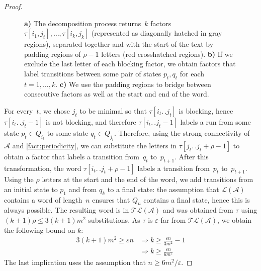 \documentclass[letterpaper, USenglish, cleveref, autoref, thm-restate, numberwithinsect]{lipics-v2021}
\theoremstyle{theorem}
\theoremstyle{definition}
\newcommand{\Aa}{\mathcal{A}}
\newcommand{\dd}{.\,.}
\newcommand{\eps}{\varepsilon}
\newcommand{\lang}[1]{\mathcal{L}(#1)}
\newcommand{\timedlang}[1]{\mathcal{TL}( #1 )}
\begin{document}
\begin{proof}
\begin{figure}[htbp]
\begin{center}

        \caption[Decomposition process for finding many blocking factors in $\eps$-far words]{\textbf{a)} The decomposition process returns~$k$ factors $\tau[i_1, j_t], \ldots, \tau[i_k,j_k]$ (represented as diagonally hatched in gray regions), separated together and with the start of the text by padding regions of $\rho-1$ letters (red crosshatched regions).
        \textbf{b)} If we exclude the last letter of each blocking factor, we obtain factors that label transitions between some pair of states $p_t, q_t$ for each $t = 1,\ldots, k$.
        \textbf{c)} We use the padding regions to bridge between consecutive factors as well as the start and end of the word.}
        \label{fig:many-blocking}
    \end{center}
    \end{figure}

    For every~$t$, we chose $j_t$ to be minimal so that $\tau[i_t\dd j_t]$ is blocking, hence $\tau[i_t\dd j_t-1]$ is not blocking, and therefore $\tau[i_t\dd j_t-1]$ labels a run from some state $p_t \in Q_{i_t}$ to some state $q_t \in Q_{j_t}$.
    Therefore, using the strong connectivity of~$\Aa$ and \cref{fact:periodicity}, we can substitute  the letters in $\tau[j_t\dd  j_t+\rho-1]$ to obtain a factor that labels a transition from~$q_t$ to~$p_{t+1}$. After this transformation, the word $\tau[i_t\dd  j_t+\rho-1]$ labels a transition from~$p_t$ to~$p_{t+1}$.
    Using the $\rho$ letters at the start and the end of the word, we add transitions from an initial state to $p_1$ and from $q_k$ to a final state: the assumption that $\lang{\Aa}$ contains a word of length~$n$ ensures that $Q_n$ contains a final state, hence this is always possible.
    The resulting word is in $\timedlang{\Aa}$ and was obtained from $\tau$ using $(k+1)\rho \le 3(k+1)m^2$ substitutions.
    As $\tau$ is $\eps$-far from $\timedlang{\Aa}$, we obtain the following bound on $k$:
    \begin{align*}
        3(k+1)m^2 \ge \eps n
&\Longrightarrow k \ge \frac{\eps n}{3m^2}-1\\
            &\Longrightarrow k \ge \frac{\eps n}{6m^2}
    \end{align*}
    The last implication uses the assumption that $n \ge 6m^2 / \eps$.
\end{proof}
\end{document}
